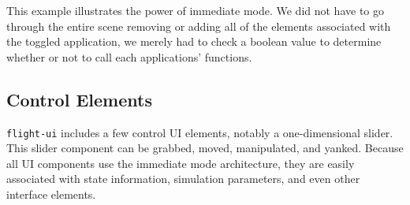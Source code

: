 \documentclass[conference,12pt]{IEEEtran}
\begin{document}
This example illustrates the power of immediate mode. We did not have to go
through the entire scene removing or adding all of the elements associated with
the toggled application, we merely had to check a boolean value to determine
whether or not to call each applications' functions.

\subsection{Control Elements}

\texttt{flight-ui} includes a few control UI elements, notably a one-dimensional
slider. This slider component can be grabbed, moved, manipulated, and yanked.
Because all UI components use the immediate mode architecture, they are easily
associated with state information, simulation parameters, and even other
interface elements.
\end{document}
